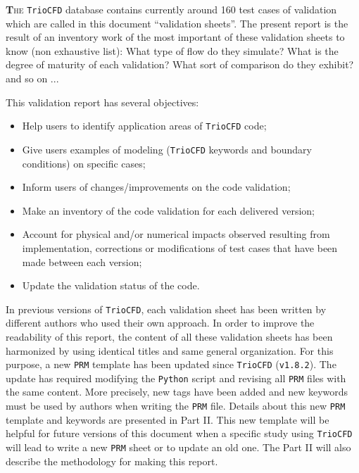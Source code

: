 \lettrine[lines=2,slope=0pt,nindent=4pt]{\textbf{T}}{he} \texttt{TrioCFD}
database contains currently around 160 test cases of validation which
are called in this document ``validation sheets''. The present
report is the result of an inventory work of the most important of these validation
sheets to know (non exhaustive list): What type of flow do they simulate?
What is the degree of maturity of each validation? What sort of
comparison do they exhibit? and so on ... \smallskip\newline

This validation report has several objectives:
\begin{itemize}
\item Help users to identify application areas of \texttt{TrioCFD} code;
\item Give users examples of modeling (\texttt{TrioCFD} keywords and boundary
conditions) on specific cases;
\item Inform users of changes/improvements on the code validation;
\item Make an inventory of the code validation for each delivered version;
\item Account for physical and/or numerical impacts observed resulting from
implementation, corrections or modifications of test cases that have
been made between each version;
\item Update the validation status of the code.
\end{itemize}

In previous versions of \texttt{TrioCFD}, each validation sheet has
been written by different authors who used their own approach. In order
to improve the readability of this report, the content of all these validation
sheets has been harmonized by using identical titles and same general
organization. For this purpose, a new \texttt{PRM} template has been
updated since \texttt{TrioCFD} (\texttt{v1.8.2}). The update has required
modifying the \texttt{Python} script and revising all \texttt{PRM}
files with the same content. More precisely, new tags have been added
and new keywords must be used by authors when writing the \texttt{PRM}
file. Details about this new \texttt{PRM} template and keywords are presented
in Part II. This new template will be helpful for future versions
of this document when a specific study using \texttt{TrioCFD} will
lead to write a new \texttt{PRM} sheet or to update an old one. The Part II
will also describe the methodology for making this report.\smallskip\newline

